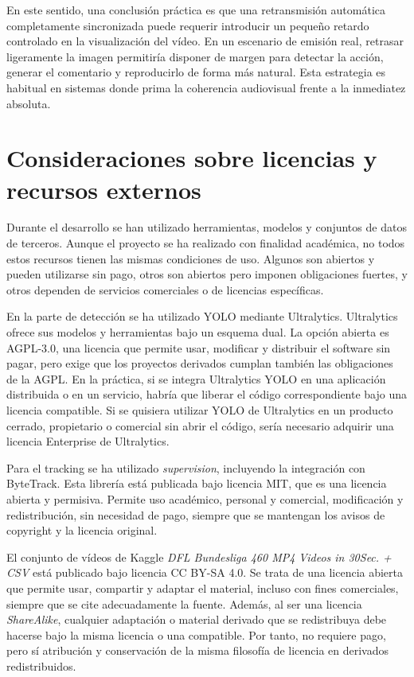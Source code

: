 En este sentido, una conclusión práctica es que una retransmisión automática completamente sincronizada puede requerir introducir un pequeño retardo controlado en la visualización del vídeo. En un escenario de emisión real, retrasar ligeramente la imagen permitiría disponer de margen para detectar la acción, generar el comentario y reproducirlo de forma más natural. Esta estrategia es habitual en sistemas donde prima la coherencia audiovisual frente a la inmediatez absoluta.

\section{Consideraciones sobre licencias y recursos externos}

Durante el desarrollo se han utilizado herramientas, modelos y conjuntos de datos de terceros. Aunque el proyecto se ha realizado con finalidad académica, no todos estos recursos tienen las mismas condiciones de uso. Algunos son abiertos y pueden utilizarse sin pago, otros son abiertos pero imponen obligaciones fuertes, y otros dependen de servicios comerciales o de licencias específicas.

En la parte de detección se ha utilizado YOLO mediante Ultralytics. Ultralytics ofrece sus modelos y herramientas bajo un esquema dual. La opción abierta es AGPL-3.0, una licencia que permite usar, modificar y distribuir el software sin pagar, pero exige que los proyectos derivados cumplan también las obligaciones de la AGPL. En la práctica, si se integra Ultralytics YOLO en una aplicación distribuida o en un servicio, habría que liberar el código correspondiente bajo una licencia compatible. Si se quisiera utilizar YOLO de Ultralytics en un producto cerrado, propietario o comercial sin abrir el código, sería necesario adquirir una licencia Enterprise de Ultralytics.

Para el tracking se ha utilizado \textit{supervision}, incluyendo la integración con ByteTrack. Esta librería está publicada bajo licencia MIT, que es una licencia abierta y permisiva. Permite uso académico, personal y comercial, modificación y redistribución, sin necesidad de pago, siempre que se mantengan los avisos de copyright y la licencia original.

El conjunto de vídeos de Kaggle \textit{DFL Bundesliga 460 MP4 Videos in 30Sec. + CSV} está publicado bajo licencia CC BY-SA 4.0. Se trata de una licencia abierta que permite usar, compartir y adaptar el material, incluso con fines comerciales, siempre que se cite adecuadamente la fuente. Además, al ser una licencia \textit{ShareAlike}, cualquier adaptación o material derivado que se redistribuya debe hacerse bajo la misma licencia o una compatible. Por tanto, no requiere pago, pero sí atribución y conservación de la misma filosofía de licencia en derivados redistribuidos.

